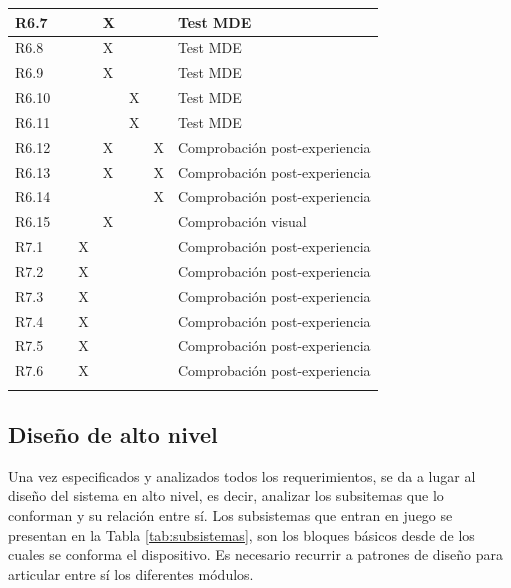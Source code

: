\begin{longtable}[c]{lllllll}
R6.7 &  &  & X &  &  & Test MDE \\ \hline
R6.8 &  &  & X &  &  & Test MDE \\ \hline
R6.9 &  &  & X &  &  & Test MDE \\ \hline
R6.10 &  &  &  & X &  & Test MDE \\ \hline
R6.11 &  &  &  & X &  & Test MDE \\ \hline
R6.12 &  &  & X &  & X & Comprobación post-experiencia \\ \hline
R6.13 &  &  & X &  & X & Comprobación post-experiencia \\ \hline
R6.14 &  &  &  &  & X & Comprobación post-experiencia \\ \hline
R6.15 &  &  & X &  &  & Comprobación visual \\ \hline
R7.1 &  & X &  &  &  & Comprobación post-experiencia \\ \hline
R7.2 &  & X &  &  &  & Comprobación post-experiencia \\ \hline
R7.3 &  & X &  &  &  & Comprobación post-experiencia \\ \hline
R7.4 &  & X &  &  &  & Comprobación post-experiencia \\ \hline
R7.5 &  & X &  &  &  & Comprobación post-experiencia \\ \hline
R7.6 &  & X &  &  &  & Comprobación post-experiencia \\ \hline
\label{tab:matrizTrazabilidad}\\
\end{longtable}

\normalsize


\subsection{Diseño de alto nivel} \label{disAltoNivel}

Una vez especificados y analizados todos los requerimientos, se da a lugar al diseño del sistema en alto nivel, es decir, analizar los subsitemas que lo conforman y su relación entre sí. Los subsistemas que entran en juego se presentan en la Tabla \ref{tab:subsistemas}, son los bloques básicos desde de los cuales se conforma el dispositivo. Es necesario recurrir a patrones de diseño \citep{douglass2011} para articular entre sí los diferentes módulos.

